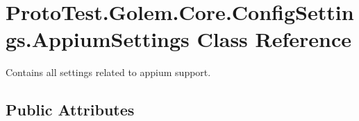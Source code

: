 \hypertarget{class_proto_test_1_1_golem_1_1_core_1_1_config_settings_1_1_appium_settings}{\section{Proto\-Test.\-Golem.\-Core.\-Config\-Settings.\-Appium\-Settings Class Reference}
\label{class_proto_test_1_1_golem_1_1_core_1_1_config_settings_1_1_appium_settings}
}


Contains all settings related to appium support.  


\subsection*{Public Attributes}
